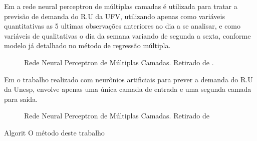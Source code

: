 \documentclass[	12pt, Times, openright, twoside, a4paper, english, brazil]{abntex2}
\begin{document}
          Em \cite{Lopes2008} a rede neural perceptron de múltiplas camadas é utilizada para tratar a previsão de demanda do R.U da UFV, utilizando apenas como variáveis quantitativas as 5 ultimas observações anteriores ao dia a se analisar, e como variáveis de qualitativas o dia da semana variando de segunda a sexta, conforme modelo já detalhado no método de regressão múltipla.
          \begin{figure}[!ht]
          	\caption{Rede Neural Perceptron de Múltiplas Camadas. Retirado de \cite{Lopes2008}.\label{fig:Rna-Perceptron-MultiLayer}}
          \end{figure}

          Em \cite{Rocha2011} o trabalho realizado com neurônios artificiais para prever a demanda do R.U da Unesp, envolve apenas uma única camada de entrada e uma segunda camada para saída. 
          \begin{figure}[!ht]
          	\caption{Rede Neural Perceptron de Múltiplas Camadas. Retirado de  \cite{Rocha2011} \label{fig:rnaRocha}}
          \end{figure}
          Algorit
          O método deste trabalho
\end{document}
